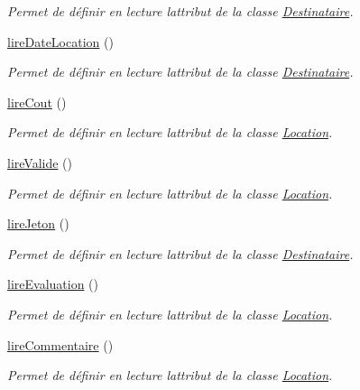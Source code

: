\begin{DoxyCompactItemize}
\begin{DoxyCompactList}\small\item\em Permet de définir en lecture l\textquotesingle{}attribut de la classe \hyperlink{class_destinataire}{Destinataire}. \end{DoxyCompactList}\item 
\hyperlink{class_location_a5f55b6cf4473133663917708b5b80d12}{lire\+Date\+Location} ()
\begin{DoxyCompactList}\small\item\em Permet de définir en lecture l\textquotesingle{}attribut de la classe \hyperlink{class_destinataire}{Destinataire}. \end{DoxyCompactList}\item 
\hyperlink{class_location_afe7ddd85e80decd9946555ca10116b8e}{lire\+Cout} ()
\begin{DoxyCompactList}\small\item\em Permet de définir en lecture l\textquotesingle{}attribut de la classe \hyperlink{class_location}{Location}. \end{DoxyCompactList}\item 
\hyperlink{class_location_a3968f27d68529387d6e3b1de5bc871a4}{lire\+Valide} ()
\begin{DoxyCompactList}\small\item\em Permet de définir en lecture l\textquotesingle{}attribut de la classe \hyperlink{class_location}{Location}. \end{DoxyCompactList}\item 
\hyperlink{class_location_aa3e283dd18d0849aae29d32a517f5d91}{lire\+Jeton} ()
\begin{DoxyCompactList}\small\item\em Permet de définir en lecture l\textquotesingle{}attribut de la classe \hyperlink{class_destinataire}{Destinataire}. \end{DoxyCompactList}\item 
\hyperlink{class_location_a7defef587f25226b708993dd1f95a84b}{lire\+Evaluation} ()
\begin{DoxyCompactList}\small\item\em Permet de définir en lecture l\textquotesingle{}attribut de la classe \hyperlink{class_location}{Location}. \end{DoxyCompactList}\item 
\hyperlink{class_location_a660ded4be3f297397899580904897074}{lire\+Commentaire} ()
\begin{DoxyCompactList}\small\item\em Permet de définir en lecture l\textquotesingle{}attribut de la classe \hyperlink{class_location}{Location}. \end{DoxyCompactList}\item 

\end{DoxyCompactItemize}
